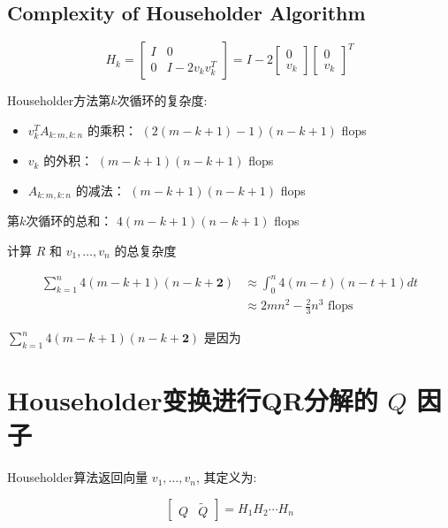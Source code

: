 \subsection{Complexity of Householder Algorithm}

$$ H_{k}=\left[\begin{array}{cc}I & 0 \\ 0 & I-2 v_{k} v_{k}^{T}\end{array}\right]=I-2\left[\begin{array}{c}0 \\ v_{k}\end{array}\right]\left[\begin{array}{l}0 \\ v_{k}\end{array}\right]^{T} $$

Householder方法第$k$次循环的复杂度:

\begin{itemize}
    \item $ v_{k}^{T} A_{k: m, k: n} $ 的乘积： $ (2({m}-{k}+1)-1)({n}-{k}+1) $ flops
    \item $ v_{k} $ 的外积： $ (m-k+1)(n-k+1) $ flops
    \item $ A_{k: m, k: n} $ 的减法： $ ({m}-{k}+1)({n}-{k}+1) $ flops
\end{itemize}

第$k$次循环的总和： $ 4({m}-{k}+1)({n}-{k}+1) $ flops

计算 $ R $ 和 $ v_{1}, \ldots, v_{n} $ 的总复杂度

$$ \begin{aligned} \sum_{k=1}^{n} 4(m-k+1)(n-k+\boldsymbol{2}) & \approx \int_{0}^{n} 4(m-t)(n-t+1) d t \\ & \approx 2 m n^{2}-\frac{2}{3} n^{3} \text { flops } \end{aligned} $$

\begin{remark}
    $\sum_{k=1}^{n} 4(m-k+1)(n-k+\boldsymbol{2})$ 是因为
\end{remark}

\section{Householder变换进行QR分解的 $Q$ 因子}

Householder算法返回向量 $ v_{1}, \ldots, v_{n} $, 其定义为:

\begin{definition}
   $$
\left[\begin{array}{ll}
Q & \tilde{Q}
\end{array}\right]=H_{1} H_{2} \cdots H_{n}
$$ 
\end{definition}

